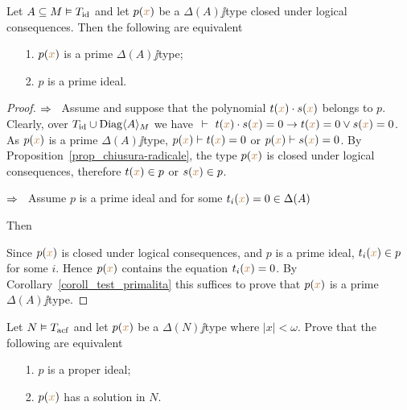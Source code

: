 \documentclass[creche.tex]{subfiles}
\begin{document}
\begin{proposition}\label{prop_tipi_e_ideali_primi}
Let $A\subseteq M\models T_{\rm id}$ and let $p({\mr x})$ be a $\Delta(A)\jj$type closed under logical consequences. Then the following are equivalent
\begin{itemize}
\item[1.] $p({\mr x})$ is a prime $\Delta(A)\jj$type;
\item[2.] $p$ is a prime ideal.
\end{itemize}
\end{proposition}

\begin{proof}
$\IMP$ \ Assume  and suppose that the polynomial $t({\mr x})\cdot s({\mr x})$ belongs to $p$. Clearly, over $T_{\rm id} \cup\Diag\<A\>_M$  we have $\ \proves\ t({\mr x})\cdot s({\mr x})=0\imp  t({\mr x})=0\vee s({\mr x})=0$. As $p({\mr x})$ is a prime $\Delta(A)\jj$type, $p({\mr x})\proves t({\mr x})=0$ or $p({\mr x})\proves s({\mr x})=0$. By Proposition~\ref{prop_chiusura-radicale}, the type $p({\mr x})$ is closed under logical consequences, therefore $t({\mr x})\in p$ or $s({\mr x})\in p$.

$\IMP$ \ Assume $p$ is a prime ideal and for some $t_i({\mr x})=0\in\Delta(A)$


Then


Since $p({\mr x})$ is closed under logical consequences, and $p$ is a prime ideal, $t_i({\mr x})\in p$ for some $i$. Hence $p({\mr x})$ contains the equation $t_i({\mr x})=0$. By Corollary~\ref{coroll_test_primalita} this suffices to prove that $p({\mr x})$ is a prime $\Delta(A)\jj$type.
\end{proof}




\begin{exercise}\label{ex_weakNullstellensatz}Let $N\models T_{\rm acf}$ and let $p({\mr x})$ be a $\Delta(N)\jj$type where $|x|<\omega$. Prove that the following are equivalent
\begin{itemize}
\item[1.] $p$ is a proper ideal;
\item[2.] $p({\mr x})$ has a solution in $N$.\QED
\end{itemize}
\end{exercise}
\end{document}
